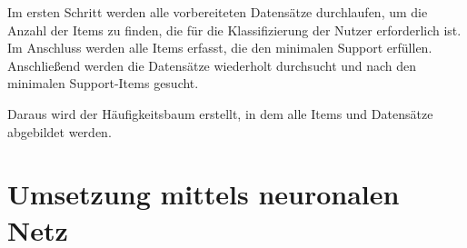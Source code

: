 Im ersten Schritt werden alle vorbereiteten Datensätze durchlaufen, um die Anzahl der Items zu finden, die für die Klassifizierung der Nutzer erforderlich ist. Im Anschluss werden alle Items erfasst, die den minimalen Support erfüllen. Anschließend werden die Datensätze wiederholt durchsucht und nach den minimalen Support-Items gesucht.\vspace{0.2cm}

Daraus wird der Häufigkeitsbaum erstellt, in dem alle Items und Datensätze abgebildet werden.

\section{Umsetzung mittels neuronalen Netz}

